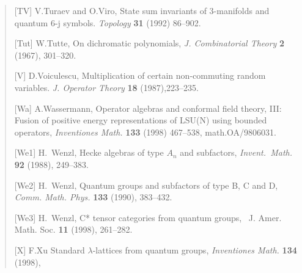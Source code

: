 \begin{verse}
[TV] V.Turaev and O.Viro, State sum invariants of
3-manifolds and quantum 6-j symbols. {\it
     Topology} {\bf 31} (1992) 86--902.

[Tut] W.Tutte, On dichromatic polynomials, 
{\it J. Combinatorial Theory} {\bf 2} (1967), 301--320.


[V] D.Voiculescu, Multiplication of certain non-commuting
random variables. {\it J. Operator Theory} {\bf 18} (1987),223--235.

[Wa] A.Wassermann, Operator algebras and conformal field theory, III:
Fusion of positive energy representations of LSU(N) using bounded
operators,
{\it Inventiones Math.} {\bf 133} (1998) 467--538, math.OA/9806031.

[We1]  H.~Wenzl,  Hecke algebras of type $A_n$ and
subfactors, {\it Invent.~Math.} {\bf 92} (1988), 249--383.

[We2]  H.~Wenzl,  Quantum groups and subfactors of type B, C
  and D, {\it Comm. Math. Phys.} {\bf 133} (1990), 383--432.

[We3]  H.~Wenzl, C* tensor categories from quantum groups,
{\ J. Amer. Math. Soc.} {\bf 11} (1998), 261--282. 

[X] F.Xu Standard $\lambda$-lattices from quantum groups,
{\it Inventiones Math.} {\bf 134} (1998),
\end{verse}

\enddocument


